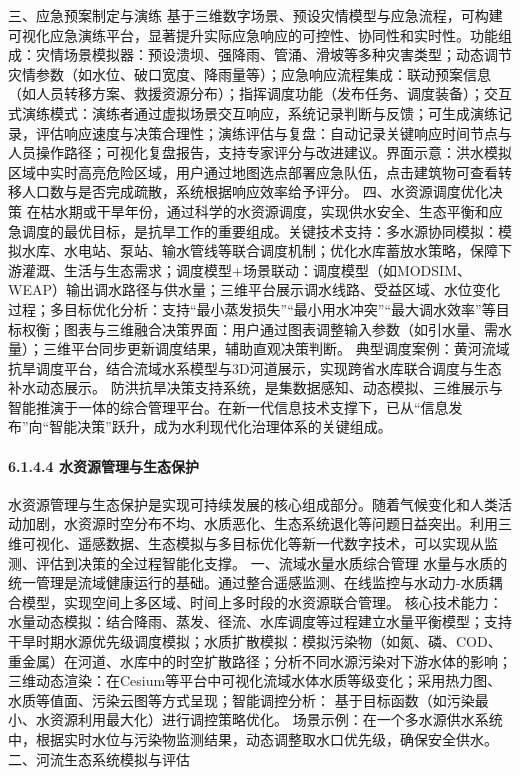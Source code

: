 {三、应急预案制定与演练
基于三维数字场景、预设灾情模型与应急流程，可构建可视化应急演练平台，显著提升实际应急响应的可控性、协同性和实时性。功能组成：灾情场景模拟器：预设溃坝、强降雨、管涌、滑坡等多种灾害类型；动态调节灾情参数（如水位、破口宽度、降雨量等）；应急响应流程集成：联动预案信息（如人员转移方案、救援资源分布）；指挥调度功能（发布任务、调度装备）；交互式演练模式：演练者通过虚拟场景交互响应，系统记录判断与反馈；可生成演练记录，评估响应速度与决策合理性；演练评估与复盘：自动记录关键响应时间节点与人员操作路径；可视化复盘报告，支持专家评分与改进建议。界面示意：洪水模拟区域中实时高亮危险区域，用户通过地图选点部署应急队伍，点击建筑物可查看转移人口数与是否完成疏散，系统根据响应效率给予评分。
四、水资源调度优化决策
在枯水期或干旱年份，通过科学的水资源调度，实现供水安全、生态平衡和应急调度的最优目标，是抗旱工作的重要组成。关键技术支持：多水源协同模拟：模拟水库、水电站、泵站、输水管线等联合调度机制；优化水库蓄放水策略，保障下游灌溉、生活与生态需求；调度模型+场景联动：调度模型（如MODSIM、WEAP）输出调水路径与供水量；三维平台展示调水线路、受益区域、水位变化过程；多目标优化分析：支持``最小蒸发损失''``最小用水冲突''``最大调水效率''等目标权衡；图表与三维融合决策界面：用户通过图表调整输入参数（如引水量、需水量）；三维平台同步更新调度结果，辅助直观决策判断。
典型调度案例：黄河流域抗旱调度平台，结合流域水系模型与3D河道展示，实现跨省水库联合调度与生态补水动态展示。
防洪抗旱决策支持系统，是集数据感知、动态模拟、三维展示与智能推演于一体的综合管理平台。在新一代信息技术支撑下，已从``信息发布''向``智能决策''跃升，成为水利现代化治理体系的关键组成。 \paragraph{6.1.4.4
水资源管理与生态保护}\label{ux6c34ux8d44ux6e90ux7ba1ux7406ux4e0eux751fux6001ux4fddux62a4}
水资源管理与生态保护是实现可持续发展的核心组成部分。随着气候变化和人类活动加剧，水资源时空分布不均、水质恶化、生态系统退化等问题日益突出。利用三维可视化、遥感数据、生态模拟与多目标优化等新一代数字技术，可以实现从监测、评估到决策的全过程智能化支撑。
一、流域水量水质综合管理 水量与水质的统一管理是流域健康运行的基础。通过整合遥感监测、在线监控与水动力-水质耦合模型，实现空间上多区域、时间上多时段的水资源联合管理。
核心技术能力：水量动态模拟：结合降雨、蒸发、径流、水库调度等过程建立水量平衡模型；支持干旱时期水源优先级调度模拟；水质扩散模拟：模拟污染物（如氮、磷、COD、重金属）在河道、水库中的时空扩散路径；分析不同水源污染对下游水体的影响；三维动态渲染：在Cesium等平台中可视化流域水体水质等级变化；采用热力图、水质等值面、污染云图等方式呈现；智能调控分析：
基于目标函数（如污染最小、水资源利用最大化）进行调控策略优化。 场景示例：在一个多水源供水系统中，根据实时水位与污染物监测结果，动态调整取水口优先级，确保安全供水。 二、河流生态系统模拟与评估
}
